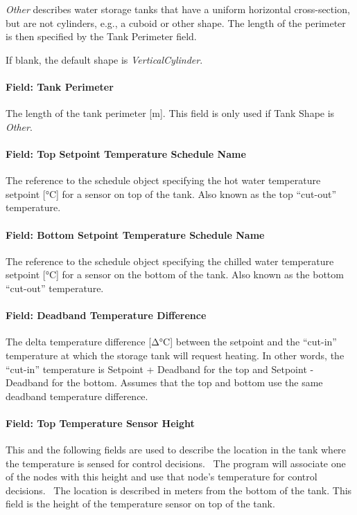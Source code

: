 \emph{Other} describes water storage tanks that have a uniform horizontal
cross-section, but are not cylinders, e.g., a cuboid or other shape. The length
of the perimeter is then specified by the Tank Perimeter field.

If blank, the default shape is \emph{VerticalCylinder}.

\paragraph{Field: Tank Perimeter}\label{field-tank-perimeter-thermalstoragehotwaterstratified}

The length of the tank perimeter {[}m{]}. This field is only used if Tank Shape
is \emph{Other}.
\paragraph{Field: Top Setpoint Temperature Schedule Name}
The reference to the schedule object specifying the hot water temperature
setpoint {[}°C{]} for a sensor on top of the tank. Also known as the top
``cut-out'' temperature.
\paragraph{Field: Bottom Setpoint Temperature Schedule Name}
The reference to the schedule object specifying the chilled water temperature
setpoint {[}°C{]} for a sensor on the bottom of the tank. Also known as the
bottom ``cut-out'' temperature.
\paragraph{Field: Deadband Temperature Difference}\label{field-deadband-temperature-difference-thermalstoragehotwaterstratified}
The delta temperature difference {[}Δ°C{]} between the setpoint and the
``cut-in'' temperature at which the storage tank will request heating. In other
words, the ``cut-in'' temperature is Setpoint + Deadband for the top and
Setpoint - Deadband for the bottom. Assumes that the top and bottom use the same
deadband temperature difference.
\paragraph{Field: Top Temperature Sensor Height}\label{field-top-temperature-sensor-height-thermalstoragehotwaterstratified}
This and the following fields are used to describe the location in the tank where the temperature is
sensed for control decisions.~ The program will associate one of the nodes with
this height and use that node's temperature for control decisions.~ The location
is described in meters from the bottom of the tank.
This field is the height of the temperature sensor on top of the tank.
